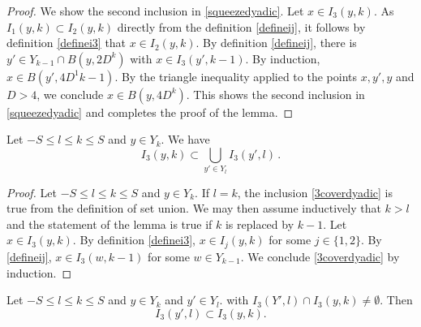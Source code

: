 \begin{proof}
We show the second inclusion in \eqref{squeezedyadic}.
Let $x\in I_3(y,k)$. As $I_1(y,k)\subset I_2(y,k)$
directly from the definition \eqref{defineij},
it follows by definition \eqref{definei3} that
$x\in I_2(y,k)$. By definition
\eqref{defineij}, there is $y'\in Y_{k-1}\cap B(y,2D^k)$
with $x\in I_3(y',k-1)$. By induction,
$x\in B(y', 4D^1{k-1})$. By the triangle inequality
applied to the points $x,y',y$ and $D>4$, we conclude
$x\in B(y,4D^k)$.
This shows the second inclusion in \eqref{squeezedyadic} and completes the proof of the lemma.
\end{proof}

\begin{lemma}\label{icoveri}
Let  $-S\le l\le k\le S$ and
$y\in Y_k$.
We have
\begin{equation}\label{3coverdyadic}
    I_3(y,k)\subset \bigcup_{y'\in Y_l} I_3(y',l)\, .
\end{equation}
\end{lemma}
\begin{proof}

Let $-S\le l\le k\le S$ and $y\in Y_k$.
If $l=k$, the inclusion \eqref{3coverdyadic}
is true from the definition of set union.
We may then assume inductively that $k>l$ and the statement of the lemma is true if $k$ is replaced by $k-1$.
Let $x\in I_3(y,k)$.
By definition \eqref{definei3},  $x\in I_j(y,k)$
for some $j\in \{1,2\}$. By \eqref{defineij},
$x\in I_3(w,k-1)$ for some $w\in Y_{k-1}$.
We conclude \eqref{3coverdyadic} by induction.
\end{proof}

\begin{lemma}\label{3dyadiclemma}
Let  $-S\le l\le k\le S$ and
$y\in Y_k$ and  $y'\in Y_l$.
with
$I_3(Y',l)\cap I_3(y,k)\neq \emptyset$.  Then
\begin{equation}
    \label{3dyadicproperty}
I_3(y',l)\subset I_3(y,k).
\end{equation}


\end{lemma}

